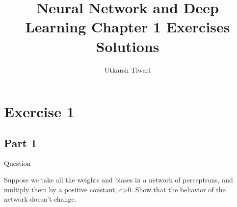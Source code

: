 \documentclass{article}
\title{Neural Network and Deep Learning Chapter 1 Exercises Solutions}
\author{Utkarsh Tiwari}
\begin{document}
\maketitle

\section*{Exercise 1}
\subsection*{Part 1}
Question

Suppose we take all the weights and biases in a network of perceptrons, and multiply them by a positive constant, c>0. Show that the behavior of the network doesn't change.
\end{document}
